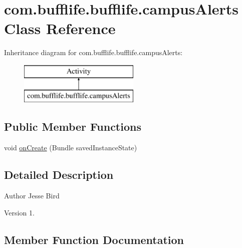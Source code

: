 \hypertarget{classcom_1_1bufflife_1_1bufflife_1_1campus_alerts}{}\section{com.\+bufflife.\+bufflife.\+campus\+Alerts Class Reference}
\label{classcom_1_1bufflife_1_1bufflife_1_1campus_alerts}
Inheritance diagram for com.\+bufflife.\+bufflife.\+campus\+Alerts\+:\begin{figure}[H]
\begin{center}
\leavevmode
\includegraphics[height=2.000000cm]{classcom_1_1bufflife_1_1bufflife_1_1campus_alerts}
\end{center}
\end{figure}
\subsection*{Public Member Functions}
\begin{DoxyCompactItemize}
\item 
void \hyperlink{classcom_1_1bufflife_1_1bufflife_1_1campus_alerts_af633a15fc57680bdf2f54b05bfefd131}{on\+Create} (Bundle saved\+Instance\+State)
\end{DoxyCompactItemize}


\subsection{Detailed Description}
\begin{DoxyAuthor}{Author}
Jesse Bird 
\end{DoxyAuthor}
\begin{DoxyVersion}{Version}
1. 
\end{DoxyVersion}


\subsection{Member Function Documentation}
\hypertarget{classcom_1_1bufflife_1_1bufflife_1_1campus_alerts_af633a15fc57680bdf2f54b05bfefd131}{}
